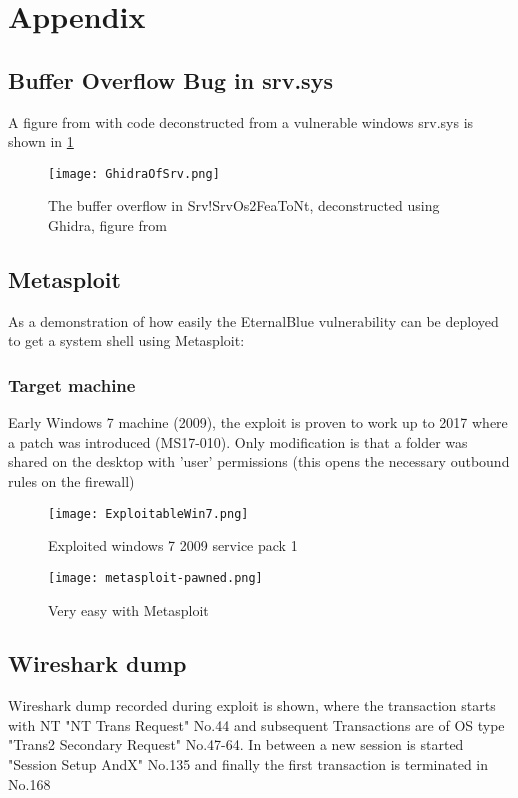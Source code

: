 \documentclass[
	letterpaper, %
	10pt, %
	unnumberedsections, %
	twoside, %
]{LTJournalArticle}
\begin{document}
\clearpage
\appendix
\section{Appendix} \label{Appendix}

\subsection{Buffer Overflow Bug in srv.sys}
A figure from \cite{h3xduck} with code deconstructed from a vulnerable windows srv.sys is shown in \ref{fig:Ghidra_srv.sys}


\begin{figure}[ht] %
	\texttt{[image: GhidraOfSrv.png]}
	\caption{The buffer overflow in Srv!SrvOs2FeaToNt, deconstructed using Ghidra, figure from \cite{h3xduck}}
	\label{fig:Ghidra_srv.sys}
\end{figure}



\subsection{Metasploit}
As a demonstration of how easily the EternalBlue vulnerability can be deployed to get a system shell using Metasploit:

\subsubsection[short]{Target machine}
Early Windows 7 machine (2009), the exploit is proven to work up to 2017 where a patch was introduced (MS17-010).
Only modification is that a folder was shared on the desktop with 'user' permissions (this opens the necessary outbound rules on the firewall)

\begin{figure}[ht] %
	\texttt{[image: ExploitableWin7.png]}
	\caption{Exploited windows 7 2009 service pack 1}
	\label{fig:ExploitableWin7}
\end{figure}

\begin{figure}[ht] %
	\texttt{[image: metasploit-pawned.png]}
	\caption{Very easy with Metasploit}
	\label{fig:metasploit-pawned}
\end{figure}

\subsection{Wireshark dump}
Wireshark dump recorded during exploit is shown, where the transaction starts with NT "NT Trans Request" No.44 and subsequent Transactions are of OS type "Trans2 Secondary Request" No.47-64. In between a new session is started "Session Setup AndX" No.135 and finally the first transaction is terminated in No.168 	     
\end{document}
